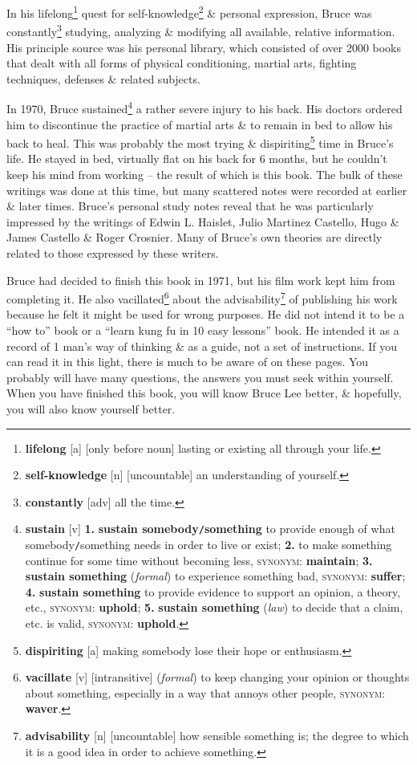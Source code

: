 \documentclass[oneside]{book}
\numberwithin{equation}{section}
\begin{document}
In his lifelong\footnote{\textbf{lifelong} [a] [only before noun] lasting or existing all through your life.} quest for self-knowledge\footnote{\textbf{self-knowledge} [n] [uncountable] an understanding of yourself.} \& personal expression, Bruce was constantly\footnote{\textbf{constantly} [adv] all the time.} studying, analyzing \& modifying all available, relative information. His principle source was his personal library, which consisted of over 2000 books that dealt with all forms of physical conditioning, martial arts, fighting techniques, defenses \& related subjects.

In 1970, Bruce sustained\footnote{\textbf{sustain} [v] \textbf{1.} \textbf{sustain somebody\texttt{/}something} to provide enough of what somebody\texttt{/}something needs in order to live or exist; \textbf{2.} to make something continue for some time without becoming less, \textsc{synonym}: \textbf{maintain}; \textbf{3.} \textbf{sustain something} (\textit{formal}) to experience something bad, \textsc{synonym}: \textbf{suffer}; \textbf{4.} \textbf{sustain something} to provide evidence to support an opinion, a theory, etc., \textsc{synonym}: \textbf{uphold}; \textbf{5.} \textbf{sustain something} (\textit{law}) to decide that a claim, etc. is valid, \textsc{synonym}: \textbf{uphold}.} a rather severe injury to his back. His doctors ordered him to discontinue the practice of martial arts \& to remain in bed to allow his back to heal. This was probably the most trying \& dispiriting\footnote{\textbf{dispiriting} [a] making somebody lose their hope or enthusiasm.} time in Bruce's life. He stayed in bed, virtually flat on his back for 6 months, but he couldn't keep his mind from working -- the result of which is this book. The bulk of these writings was done at this time, but many scattered notes were recorded at earlier \& later times. Bruce's personal study notes reveal that he was particularly impressed by the writings of Edwin L. Haislet, Julio Martinez Castello, Hugo \& James Castello \& Roger Crosnier. Many of Bruce's own theories are directly related to those expressed by these writers.

Bruce had decided to finish this book in 1971, but his film work kept him from completing it. He also vacillated\footnote{\textbf{vacillate} [v] [intransitive] (\textit{formal}) to keep changing your opinion or thoughts about something, especially in a way that annoys other people, \textsc{synonym}: \textbf{waver}.} about the advisability\footnote{\textbf{advisability} [n] [uncountable] how sensible something is; the degree to which it is a good idea in order to achieve something.} of publishing his work because he felt it might be used for wrong purposes. He did not intend it to be a ``how to'' book or a ``learn kung fu in 10 easy lessons'' book. He intended it as a record of 1 man's way of thinking \& as a guide, not a set of instructions. If you can read it in this light, there is much to be aware of on these pages. You probably will have many questions, the answers you must seek within yourself. When you have finished this book, you will know Bruce Lee better, \& hopefully, you will also know yourself better.
\end{document}

